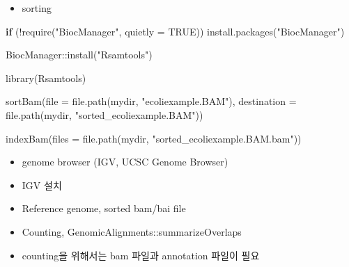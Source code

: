 \documentclass[
]{book}
\newenvironment{Shaded}{\begin{snugshade}}{\end{snugshade}}
\newcommand{\AttributeTok}[1]{\textcolor[rgb]{0.77,0.63,0.00}{#1}}
\newcommand{\ConstantTok}[1]{\textcolor[rgb]{0.00,0.00,0.00}{#1}}
\newcommand{\ControlFlowTok}[1]{\textcolor[rgb]{0.13,0.29,0.53}{\textbf{#1}}}
\newcommand{\FunctionTok}[1]{\textcolor[rgb]{0.00,0.00,0.00}{#1}}
\newcommand{\NormalTok}[1]{#1}
\newcommand{\SpecialCharTok}[1]{\textcolor[rgb]{0.00,0.00,0.00}{#1}}
\newcommand{\StringTok}[1]{\textcolor[rgb]{0.31,0.60,0.02}{#1}}
\providecommand{\tightlist}{%
  \setlength{\itemsep}{0pt}\setlength{\parskip}{0pt}}
\begin{document}
\begin{itemize}
\tightlist
\item
  sorting
\end{itemize}

\begin{Shaded}
\begin{Highlighting}[]

\ControlFlowTok{if}\NormalTok{ (}\SpecialCharTok{!}\FunctionTok{require}\NormalTok{(}\StringTok{"BiocManager"}\NormalTok{, }\AttributeTok{quietly =} \ConstantTok{TRUE}\NormalTok{))}
    \FunctionTok{install.packages}\NormalTok{(}\StringTok{"BiocManager"}\NormalTok{)}

\NormalTok{BiocManager}\SpecialCharTok{::}\FunctionTok{install}\NormalTok{(}\StringTok{"Rsamtools"}\NormalTok{)}
\end{Highlighting}
\end{Shaded}

\begin{Shaded}
\begin{Highlighting}[]
\FunctionTok{library}\NormalTok{(Rsamtools)}

\FunctionTok{sortBam}\NormalTok{(}\AttributeTok{file =} \FunctionTok{file.path}\NormalTok{(mydir, }\StringTok{"ecoliexample.BAM"}\NormalTok{),}
        \AttributeTok{destination =} \FunctionTok{file.path}\NormalTok{(mydir, }\StringTok{"sorted\_ecoliexample.BAM"}\NormalTok{))}

\FunctionTok{indexBam}\NormalTok{(}\AttributeTok{files =} \FunctionTok{file.path}\NormalTok{(mydir, }\StringTok{"sorted\_ecoliexample.BAM.bam"}\NormalTok{))}
\end{Highlighting}
\end{Shaded}

\begin{itemize}
\item
  genome browser (IGV, UCSC Genome Browser)
\item
  IGV 설치
\item
  Reference genome, sorted bam/bai file
\item
  Counting, GenomicAlignments::summarizeOverlaps
\item
  counting을 위해서는 bam 파일과 annotation 파일이 필요
\end{itemize}
\end{document}
